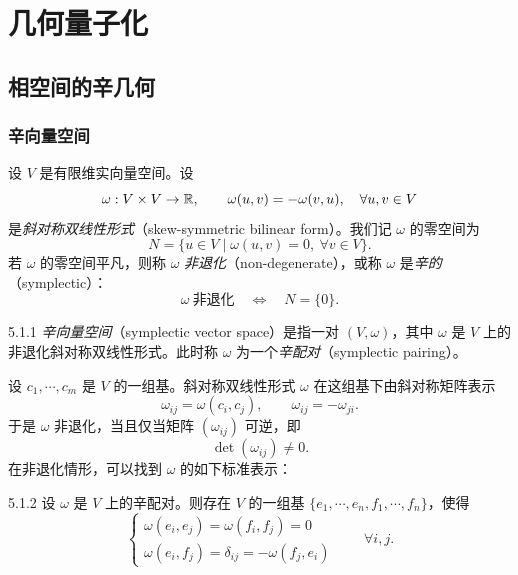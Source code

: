 
\chapter{几何量子化}


\section{相空间的辛几何}

\subsection{辛向量空间}

设 $V$ 是有限维实向量空间。设
\[
\omega:V\times V\to\mathbb{R},\qquad \omega(u,v)=-\omega(v,u),\quad \forall u,v\in V
\]
是\emph{斜对称双线性形式}（skew-symmetric bilinear form）。我们记 $\omega$ 的零空间为
\[
N=\{u\in V\mid \omega(u,v)=0,\ \forall v\in V\}.
\]
若 $\omega$ 的零空间平凡，则称 $\omega$ \emph{非退化}（non-degenerate），或称 $\omega$ 是\emph{辛的}（symplectic）：
\[
\omega\ \text{非退化}\quad\Longleftrightarrow\quad N=\{0\}.
\]

\begin{definition}{5.1.1}
\emph{辛向量空间}（symplectic vector space）是指一对 $(V,\omega)$，其中 $\omega$ 是 $V$ 上的非退化斜对称双线性形式。此时称 $\omega$ 为一个\emph{辛配对}（symplectic pairing）。
\end{definition}

设 $c_1,\cdots,c_m$ 是 $V$ 的一组基。斜对称双线性形式 $\omega$ 在这组基下由斜对称矩阵表示
\[
\omega_{ij}=\omega(c_i,c_j),\qquad \omega_{ij}=-\omega_{ji}.
\]
于是 $\omega$ 非退化，当且仅当矩阵 $(\omega_{ij})$ 可逆，即
\[
\det(\omega_{ij})\neq 0.
\]
在非退化情形，可以找到 $\omega$ 的如下标准表示：

\begin{proposition}{5.1.2}
设 $\omega$ 是 $V$ 上的辛配对。则存在 $V$ 的一组基 $\{e_1,\cdots,e_n,f_1,\cdots,f_n\}$，使得
\[
\begin{cases}
\omega(e_i,e_j)=\omega(f_i,f_j)=0\\[2pt]
\omega(e_i,f_j)=\delta_{ij}=-\omega(f_j,e_i)
\end{cases}
\qquad \forall i,j.
\]
\end{proposition}


